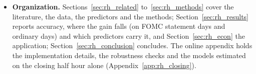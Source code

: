 \begin{itemize}
\begin{itemize}
  \item Over \rheSzDays{} expiration days the full-set strategies beat the unconditional short straddle,
    significantly in \rhemFullVsShortSig{} of the \rhorAfPairs{} classes, but beat the strategy of the HAR benchmark
    significantly in \rhemFullVsOlsHarSig{} of them; their gain over the short straddle is earned on the
    \rhedLongPctMin--\rhedLongPctMax\% of days on which they buy and rests on each strategy's \rhedNTop{} best days,
    and none of them carries a significant market beta.
  \end{itemize}
\item \textbf{Organization.} Sections~\ref{sec:rh_related} to~\ref{sec:rh_methods} cover the literature, the data,
  the predictors and the methods; Section~\ref{sec:rh_results} reports accuracy, where the gain falls (on FOMC
  statement days and ordinary days) and which predictors carry it, and Section~\ref{sec:rh_econ} the application;
  Section~\ref{sec:rh_conclusion} concludes. The online appendix holds the implementation details, the robustness
  checks and the models estimated on the closing half hour alone (Appendix~\ref{app:rh_closing}).
\end{itemize}

